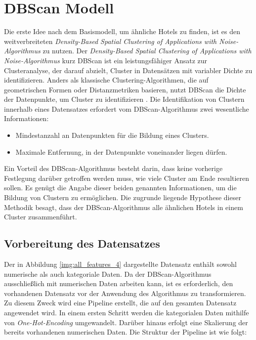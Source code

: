 \section{DBScan Modell}
\label{subsubsec:dbscan}
Die erste Idee nach dem Basismodell, um ähnliche Hotels zu finden, ist es den weitverbreiteten \emph{Density-Based Spatial Clustering of Applications with Noise-Algorithmus} zu nutzen. Der \emph{Density-Based Spatial Clustering of Applications with Noise-Algorithmus} kurz DBScan ist ein leistungsfähiger Ansatz zur Clusteranalyse, der darauf abzielt, Cluster in Datensätzen mit variabler Dichte zu identifizieren. Anders als klassische Clustering-Algorithmen, die auf geometrischen Formen oder Distanzmetriken basieren, nutzt DBScan die Dichte der Datenpunkte, um Cluster zu identifizieren \cite{6814687}.
\newline
\newline
Die Identifikation von Clustern innerhalb eines Datensatzes erfordert vom DBScan-Algorithmus zwei wesentliche Informationen:

\begin{itemize}
    \item Mindestanzahl an Datenpunkten für die Bildung eines Clusters.
    \item Maximale Entfernung, in der Datenpunkte voneinander liegen dürfen.
\end{itemize}

Ein Vorteil des DBScan-Algorithmus besteht darin, dass keine vorherige Festlegung darüber getroffen werden muss, wie viele Cluster am Ende resultieren sollen. Es genügt die Angabe dieser beiden genannten Informationen, um die Bildung von Clustern zu ermöglichen.
\newline
\newline
Die zugrunde liegende Hypothese dieser Methodik besagt, dass der DBScan-Algorithmus alle ähnlichen Hotels in einem Cluster zusammenführt.

\subsection{Vorbereitung des Datensatzes} 
Der in Abbildung \ref{img:all_features_4} dargestellte Datensatz enthält sowohl numerische als auch kategoriale Daten. Da der DBScan-Algorithmus ausschließlich mit numerischen Daten arbeiten kann, ist es erforderlich, den vorhandenen Datensatz vor der Anwendung des Algorithmus zu transformieren. Zu diesem Zweck wird eine Pipeline erstellt, die auf den gesamten Datensatz angewendet wird. In einem ersten Schritt werden die kategorialen Daten mithilfe von \emph{One-Hot-Encoding} umgewandelt. Darüber hinaus erfolgt eine Skalierung der bereits vorhandenen numerischen Daten.
\newline
\newline
Die Struktur der Pipeline ist wie folgt:

